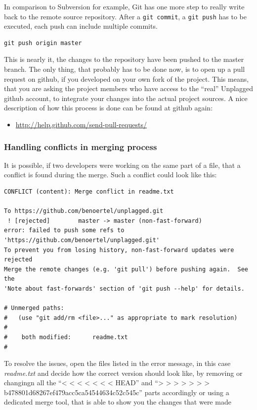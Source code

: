 In comparison to Subversion for example, Git has one more step to really write back to the remote source repository. 
After a \texttt{git commit}, a \texttt{git push} has to be executed, each push can include multiple commits.

\begin{lstlisting}[caption=Pushing to the server]
git push origin master
\end{lstlisting}

This is nearly it, the changes to the repository have been pushed to the master branch. The only thing, that probably 
has to be done
now, is to open up a pull request on github, if you developed on your own fork of the project. This means, that you 
are
asking the project members who have access to the \enquote{real} Unplagged github account, to integrate your changes 
into the actual project
sources. A nice description of how this process is done can be found at github again:

\begin{itemize}
\item \url{http://help.github.com/send-pull-requests/}
\end{itemize}

\subsubsection{Handling conflicts in merging process}

It is possible, if two developers were working on the same part of a file, that a conflict is found during the merge. 
Such 
a conflict could look like this:

\begin{lstlisting}[caption=Merge conflict, keywordstyle=\color{black}]
CONFLICT (content): Merge conflict in readme.txt

To https://github.com/benoertel/unplagged.git
 ! [rejected]        master -> master (non-fast-forward)
error: failed to push some refs to 'https://github.com/benoertel/unplagged.git'
To prevent you from losing history, non-fast-forward updates were rejected
Merge the remote changes (e.g. 'git pull') before pushing again.  See the
'Note about fast-forwards' section of 'git push --help' for details.

# Unmerged paths:
#   (use "git add/rm <file>..." as appropriate to mark resolution)
#
#    both modified:      readme.txt
#
\end{lstlisting}

To resolve the issues, open the files listed in the error message, in this case \textit{readme.txt} and decide how 
the correct 
version should look like, by removing or changingn all the \enquote{< < < < < < <  HEAD} and 
\enquote{> > > > > > > b478801d68267ef479acc5ca54544634c52c545c} 
parts accordingly or using a dedicated merge tool, that is able to show you the changes that were made

